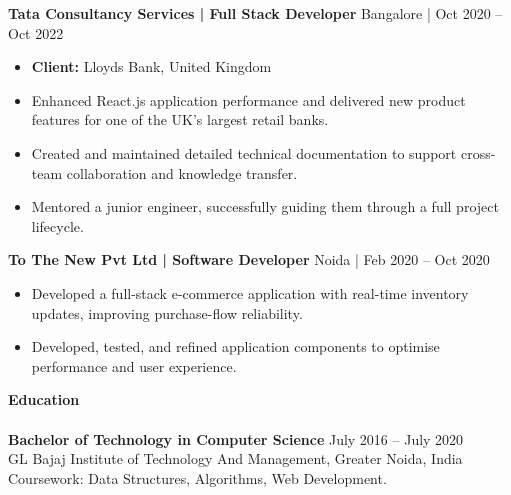 \documentclass[a4paper]{article}
\newcommand{\lineunder} {
    \vspace*{-8pt} \\
    \hspace*{-18pt} \hrulefill \\
}
\newcommand{\header} [1] {
    {\hspace*{-18pt}\vspace*{6pt} \textbf{#1}}
    \vspace*{-6pt} \lineunder
}
\begin{document}
 \textbf{Tata Consultancy Services | Full Stack Developer} \hfill Bangalore | Oct 2020 -- Oct 2022\\
          \vspace{-2mm}
\begin{itemize} \itemsep -3pt
\item[] \textbf{Client:} Lloyds Bank, United Kingdom
\item Enhanced React.js application performance and delivered new product features for one of the UK's largest retail banks.
\item Created and maintained detailed technical documentation to support cross-team collaboration and knowledge transfer.
\item Mentored a junior engineer, successfully guiding them through a full project lifecycle.
\end{itemize}
\vspace{2mm}

 \textbf{To The New Pvt Ltd | Software Developer} \hfill Noida | Feb 2020 -- Oct 2020\\
          \vspace{-2mm}
\begin{itemize} \itemsep -3pt
\item Developed a full-stack e-commerce application with real-time inventory updates, improving purchase-flow reliability.
\item Developed, tested, and refined application components to optimise performance and user experience.
\end{itemize}
\vspace{2mm}

%
%
      \header{Education}
      \vspace{2mm}
      \textbf{Bachelor of Technology in Computer Science} \hfill July 2016 -- July 2020\\
       GL Bajaj Institute of Technology And Management, Greater Noida, India\\
       Coursework: Data Structures, Algorithms, Web Development.
       \vspace{4mm}
\end{document}
